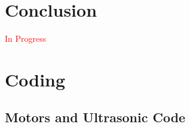 \documentclass[12pt]{article}
\begin{document}
\section{Conclusion} \label{sec:conclusion}
\begin{center}
	\textcolor{red}{In Progress}
\end{center}

\nocite{*}



\newpage

\appendix
\section{Coding} \label{sec:coding}
\subsection{Motors and Ultrasonic Code} \label{sub:}
\texttt{}
\end{document}
